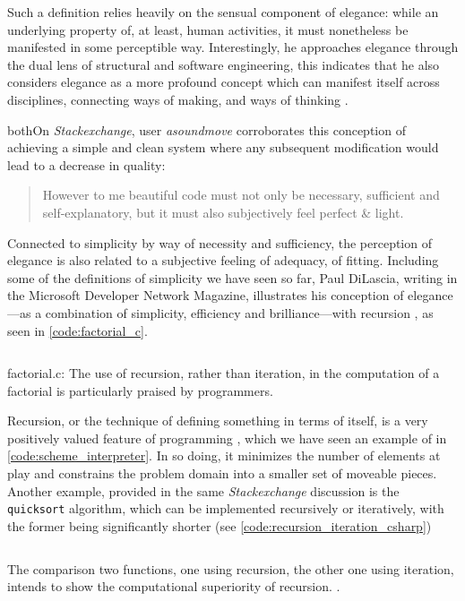 Such a definition relies heavily on the sensual component of elegance: while an underlying property of, at least, human activities, it must nonetheless be manifested in some perceptible way. Interestingly, he approaches elegance through the dual lens of structural and software engineering, this indicates that he also considers elegance as a more profound concept which can manifest itself across disciplines, connecting ways of making, and ways of thinking \citep{mclennan_who_1997}. 

bothOn \emph{Stackexchange}, user \emph{asoundmove} corroborates this conception of achieving a simple and clean system where any subsequent modification would lead to a decrease in quality:

\begin{quote}
  However to me beautiful code must not only be necessary, sufficient and self-explanatory, but it must also subjectively feel perfect \& light. \citep{stackoverflow_how_2013}
\end{quote}

Connected to simplicity by way of necessity and sufficiency, the perception of elegance is also related to a subjective feeling of adequacy, of fitting. Including some of the definitions of simplicity we have seen so far, Paul DiLascia, writing in the Microsoft Developer Network Magazine, illustrates his conception of elegance—as a combination of simplicity, efficiency and brilliance—with recursion \citep{dilascia_end_2019}, as seen in \ref{code:factorial_c}.

\begin{listing}
  \inputminted{c}{./corpus/factorial.c}
  \caption{factorial.c: The use of recursion, rather than iteration, in the computation of a factorial is particularly praised by programmers.}
  \label{code:factorial_c}
\end{listing}

Recursion, or the technique of defining something in terms of itself, is a very positively valued feature of programming \citep{abelson_structure_1979}, which we have seen an example of in \ref{code:scheme_interpreter}. In so doing, it minimizes the number of elements at play and constrains the problem domain into a smaller set of moveable pieces. Another example, provided in the same \emph{Stackexchange} discussion is the \lstinline{quicksort} algorithm, which can be implemented recursively or iteratively, with the former being significantly shorter (see \ref{code:recursion_iteration_csharp})

\begin{listing}
  \inputminted{csharp}{./corpus/recursive_iteration.cs}
  \caption{The comparison two functions, one using recursion, the other one using iteration, intends to show the computational superiority of recursion. \citep{amit_answer_2012}.}
  \label{code:recursion_iteration_csharp}
\end{listing}

